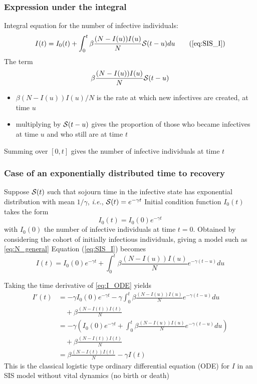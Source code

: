 \documentclass[aspectratio=169]{beamer}\usepackage[]{graphicx}\usepackage[]{xcolor}
\begin{document}
\begin{frame}\frametitle{Expression under the integral}
Integral equation for the number of infective individuals: 
\begin{equation}
I(t) = I_0(t)+ \int_0^t\beta\frac{(N-I(u))I(u)}{N} \S(t-u) du
\tag{\ref{eq:SIS_I}} 
\end{equation}
The term
\[
\beta\frac{(N-I(u))I(u)}{N} \S(t-u)
\]
\begin{itemize}
\item $\beta (N-I(u))I(u)/N$ is the rate at which new infectives are created, at time $u$
\item multiplying by $\S(t-u)$ gives the proportion of those who became
infectives at time $u$ and who still are at time $t$
\end{itemize}
Summing over $[0,t]$ gives the number of infective individuals at time $t$
\end{frame}


\begin{frame}\frametitle{Case of an exponentially distributed time to recovery}
Suppose $\S(t)$ such that sojourn time in the infective
state has exponential distribution with mean $1/\gamma$,
\textit{i.e.}, $\S(t)=e^{-\gamma t}$
\vfill
Initial condition function $I_0(t)$ takes the form
\[
I_0(t)=I_0(0)e^{-\gamma t}
\]
with $I_0(0)$ the number of infective individuals at time $t=0$. Obtained by considering the cohort of initially infectious individuals, giving a
model such as \eqref{eq:N_general}
\vfill
Equation (\ref{eq:SIS_I}) becomes
\begin{equation}\label{eq:I_ODE}
I(t)=I_0(0)e^{-\gamma t}+\int_0^t \beta\frac{(N-I(u))I(u)}{N} e^{-\gamma
(t-u)}du
\end{equation}
\end{frame}

\begin{frame}
Taking the time derivative of \eqref{eq:I_ODE} yields
\begin{align*}
I'(t) &= -\gamma I_0(0)e^{-\gamma t}-\gamma\int_0^t
\beta\frac{(N-I(u))I(u)}{N}e^{-\gamma(t-u)}du \\
&\quad +\beta \frac{(N-I(t))I(t)}{N} \\
&= -\gamma\left(I_0(0)e^{-\gamma t}+
\int_0^t \beta\frac{(N-I(u))I(u)}{N}e^{-\gamma(t-u)}du\right) \\
&\quad +\beta \frac{(N-I(t))I(t)}{N} \\
&= \beta \frac{(N-I(t))I(t)}{N}-\gamma I(t)
\end{align*}
\vfill
This is the classical logistic type ordinary differential equation (ODE) for $I$ in an SIS model without vital dynamics (no birth or death)
\end{frame}
\end{document}
